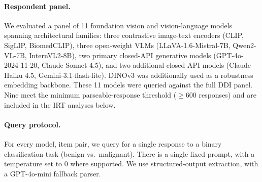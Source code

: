 \documentclass{article}
\begin{document}
\paragraph{Respondent panel.}
\label{sec:respondents}
We evaluated a panel of 11 foundation vision and vision-language models spanning architectural families: three contrastive image-text encoders (CLIP, SigLIP, BiomedCLIP), three open-weight VLMs (LLaVA-1.6-Mistral-7B, Qwen2-VL-7B, InternVL2-8B), two primary closed-API generative models (GPT-4o-2024-11-20, Claude Sonnet 4.5), and two additional closed-API models (Claude Haiku 4.5, Gemini-3.1-flash-lite). DINOv3 \citep{siméoni2025dinov3} was additionally used as a robustness embedding backbone. These 11 models were queried against the full DDI panel. Nine meet the minimum parseable-response threshold ($\geq 600$ responses) and are included in the IRT analyses below. 

\paragraph{Query protocol.}
\label{sec:query}
For every model, item pair, we query for a single response to a binary classification task (benign vs.\ malignant). There is a single fixed prompt, with a temperature set to 0 where supported. We use structured-output extraction, with a GPT-4o-mini fallback parser. %
\end{document}
